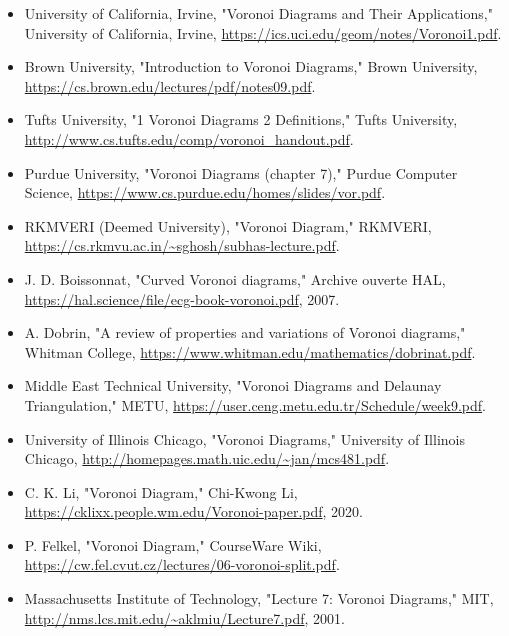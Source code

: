 \documentclass[12pt,a4paper]{report}
\begin{document}
\begin{itemize}
  \item University of California, Irvine, "Voronoi Diagrams and Their Applications," University of California, Irvine, \url{https://ics.uci.edu/geom/notes/Voronoi1.pdf}.
  
  \item Brown University, "Introduction to Voronoi Diagrams," Brown University, \url{https://cs.brown.edu/lectures/pdf/notes09.pdf}.
  
  \item Tufts University, "1 Voronoi Diagrams 2 Definitions," Tufts University, \url{http://www.cs.tufts.edu/comp/voronoi_handout.pdf}.
  
  \item Purdue University, "Voronoi Diagrams (chapter 7)," Purdue Computer Science, \url{https://www.cs.purdue.edu/homes/slides/vor.pdf}.
  
  \item RKMVERI (Deemed University), "Voronoi Diagram," RKMVERI, \url{https://cs.rkmvu.ac.in/~sghosh/subhas-lecture.pdf}.
  
  \item J. D. Boissonnat, "Curved Voronoi diagrams," Archive ouverte HAL, \url{https://hal.science/file/ecg-book-voronoi.pdf}, 2007.
  
  \item A. Dobrin, "A review of properties and variations of Voronoi diagrams," Whitman College, \url{https://www.whitman.edu/mathematics/dobrinat.pdf}.
  
  \item Middle East Technical University, "Voronoi Diagrams and Delaunay Triangulation," METU, \url{https://user.ceng.metu.edu.tr/Schedule/week9.pdf}.
  
  \item University of Illinois Chicago, "Voronoi Diagrams," University of Illinois Chicago, \url{http://homepages.math.uic.edu/~jan/mcs481.pdf}.
  
  \item C. K. Li, "Voronoi Diagram," Chi-Kwong Li, \url{https://cklixx.people.wm.edu/Voronoi-paper.pdf}, 2020.
  
  \item P. Felkel, "Voronoi Diagram," CourseWare Wiki, \url{https://cw.fel.cvut.cz/lectures/06-voronoi-split.pdf}.
  
  \item Massachusetts Institute of Technology, "Lecture 7: Voronoi Diagrams," MIT, \url{http://nms.lcs.mit.edu/~aklmiu/Lecture7.pdf}, 2001.
  

\end{itemize}
\end{document}
